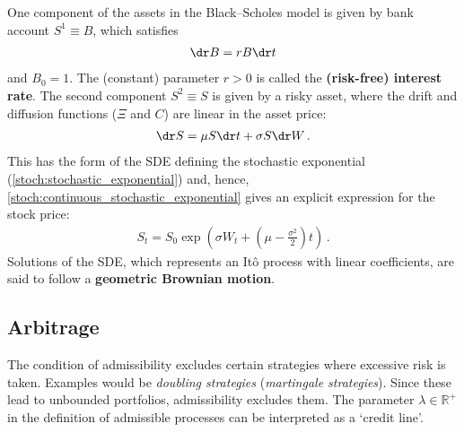     One component of the assets in the Black--Scholes model is given by bank account $S^1\equiv B$, which satisfies
    \begin{gather}
        \dr B = r B\dr t
    \end{gather}
    and $B_0=1$. The (constant) parameter $r>0$ is called the \textbf{(risk-free) interest rate}. The second component $S^2\equiv S$ is given by a risky asset, where the drift and diffusion functions ($\Xi$ and $C$) are linear in the asset price:
    \begin{gather}
        \dr S = \mu S\dr t + \sigma S\dr W\,.
    \end{gather}
    This has the form of the SDE defining the stochastic exponential (\cref{stoch:stochastic_exponential}) and, hence, \cref{stoch:continuous_stochastic_exponential} gives an explicit expression for the stock price:
    \begin{gather}
        S_t = S_0\exp\left(\sigma W_t + \left(\mu-\frac{\sigma^2}{2}\right)t\right)\,.
    \end{gather}
    Solutions of the SDE, which represents an It\^o process with linear coefficients, are said to follow a \textbf{geometric Brownian motion}. 

\subsection{Arbitrage}

    \begin{remark}[Admissibility]
        The condition of admissibility excludes certain strategies where excessive risk is taken. Examples would be \textit{doubling strategies} (\textit{martingale strategies}). Since these lead to unbounded portfolios, admissibility excludes them. The parameter $\lambda\in\mathbb{R}^+$ in the definition of admissible processes can be interpreted as a `credit line'.
    \end{remark}

